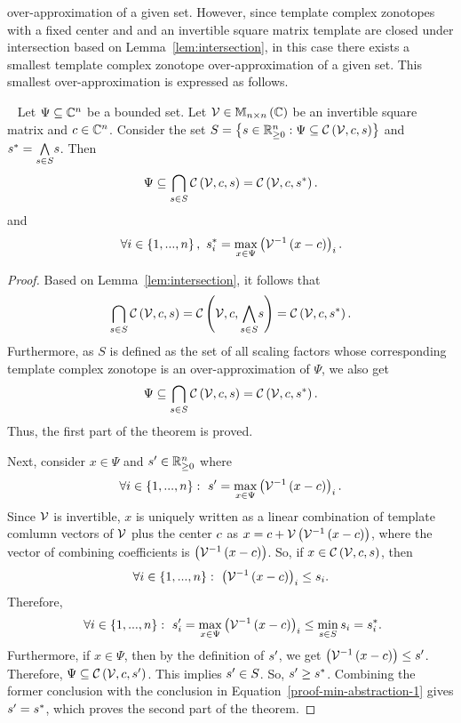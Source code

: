 over-approximation of a given set.  However, since template complex
zonotopes with a fixed center and and an invertible square matrix
template are closed under intersection based on
Lemma~\ref{lem:intersection}, in this case there exists a smallest
template complex zonotope over-approximation of a given set.  This
smallest over-approximation is expressed as follows.
%
\begin{theorem}~\label{thm:min-abstraction}
Let $\Psi\subseteq\mathbb{C}^n$ be a bounded set.  Let
$\mathcal{V}\in\mathbb{M}_{n\times n}\left(\mathbb{C}\right)$ be an invertible square matrix and
$c\in\mathbb{C}^n$.  Consider the set $S=\left\{s\in\mathbb{R}_{\geq
0}^n:\Psi\subseteq\mathit{\mathcal{C}}\left(\mathcal{V},c,s\right)\right\}$ and
$s^*=\underset{s\in S}{\bigwedge} s$.  Then
%
\begin{equation}
\Psi\subseteq\bigcap_{s\in S}\mathit{\mathcal{C}}\left(\mathcal{V},c,s\right)=\mathit{\mathcal{C}}\left(\mathcal{V},c,s^*\right).
\end{equation}
%
and
%
\begin{equation}
\forall i\in\left\{1,...,n\right\},~s^*_i=\max_{x\in\Psi}\left(\mathcal{V}^{-1}\left(x-c\right)\right)_i.
\end{equation}
%
\end{theorem}
%
\begin{proof}
Based on Lemma~\ref{lem:intersection}, it follows that
%
\[
\bigcap_{s\in
S}\mathit{\mathcal{C}}\left(\mathcal{V},c,s\right)=\mathit{\mathcal{C}}\left(\mathcal{V},c,\underset{s\in
S}{\bigwedge}s\right)=\mathit{\mathcal{C}}\left(\mathcal{V},c,s^*\right).
\]
%
Furthermore, as $S$ is defined as the set of all scaling factors
whose corresponding template complex zonotope is an over-approximation
of $\Psi$, we also get
%
\[
\Psi\subseteq\bigcap_{s\in S}\mathit{\mathcal{C}}\left(\mathcal{V},c,s\right)=\mathit{\mathcal{C}}\left(\mathcal{V},c,s^*\right).
\]
Thus, the first part of the theorem is proved.

Next, consider $x\in\Psi$ and $s^\prime\in\mathbb{R}_{\geq 0}^n$ where
%
\[
\forall
i\in\left\{1,...,n\right\}:~s^\prime=\max_{x\in\Psi}\left(\mathcal{V}^{-1}\left(x-c\right)\right)_i.
\]
%
Since $\mathcal{V}$ is invertible, $x$ is uniquely written as a linear
combination of template comlumn vectors of $\mathcal{V}$ plus the center
$c$ as $x=c+\mathcal{V}\left(\mathcal{V}^{-1}\left(x-c\right)\right)$, where the
vector of combining coefficients is
$\left(\mathcal{V}^{-1}\left(x-c\right)\right)$.  So, if
$x\in\mathit{\mathcal{C}}\left(\mathcal{V},c,s\right)$, then \[\forall
i\in\left\{1,...,n\right\}:~\left(\mathcal{V}^{-1}\left(x-c\right)\right)_i\leq s_i.\]
Therefore,
%
\begin{equation}~\label{proof-min-abstraction-1}
\forall
i\in\left\{1,...,n\right\}:~s^\prime_i=\max_{x\in\Psi}\left(\mathcal{V}^{-1}\left(x-c\right)\right)_i\leq\min_{s\in
S}s_i=s^*_i.
\end{equation}
%
Furthermore, if $x\in\Psi$, then by the definition of $s^\prime$, we
get $\left(\mathcal{V}^{-1}\left(x-c\right)\right)\leq s^\prime$.  Therefore,
$\Psi\subseteq\mathit{\mathcal{C}}\left(\mathcal{V},c,s^\prime\right)$.  This implies
$s^\prime\in S$.  So, $s^\prime\geq s^*$.  Combining the
former conclusion with the conclusion in
Equation~\ref{proof-min-abstraction-1} gives $s^\prime=s^*$,
which proves the second part of the theorem.
\end{proof}


